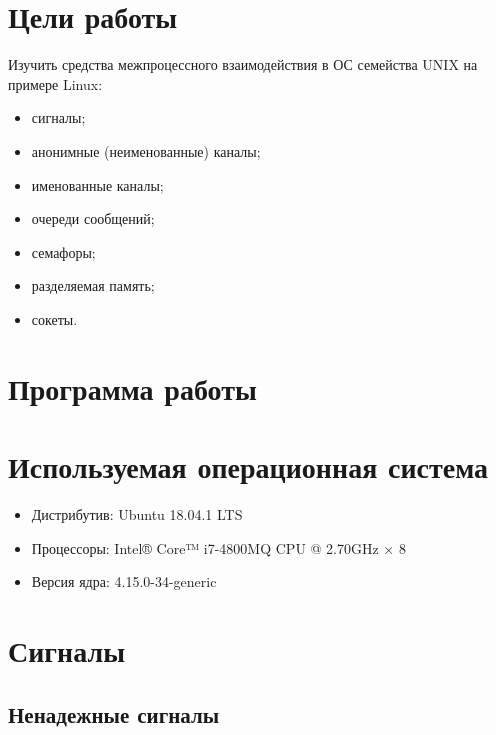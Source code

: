 





\tableofcontents
\newpage

\section{Цели работы}

Изучить средства межпроцессного взаимодействия в ОС семейства UNIX на примере Linux:

\begin{itemize}
	\item сигналы;
	\item анонимные (неименованные) каналы;
	\item именованные каналы;
	\item очереди сообщений;
	\item семафоры;
	\item разделяемая память;
	\item сокеты.
\end{itemize}

\section{Программа работы}



\newpage

\section{Используемая операционная система}

\begin{itemize}
	\item Дистрибутив: Ubuntu 18.04.1 LTS
	\item Процессоры: Intel® Core™ i7-4800MQ CPU @ 2.70GHz × 8
	\item Версия ядра: 4.15.0-34-generic
\end{itemize}

\section{Сигналы}

\subsection{Ненадежные сигналы}

